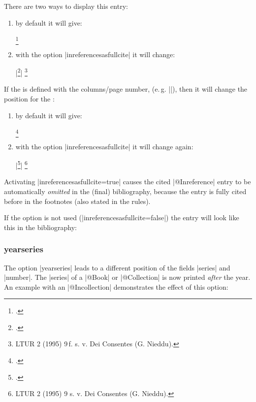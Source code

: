 \documentclass[a4paper,
10pt,
greek,
french,
spanish,
italian,
ngerman,
english,
]{ltxdoc}
\begin{document}
There are two ways to display this entry:
 \begin{enumerate}
 \item by default it will give:  
 \begin{example}
\footnote{\cite{Nieddu1995}.}
 \end{example}
 \item with the option |inreferencesasfullcite| it will change:
 \begin{tcolorbox}[examplebox]
 |\footnote{\cite{Nieddu1995}.}|
 \tcblower
\footnote{LTUR 2 (1995) 9\,f. s. v. Dei Consentes (G. Nieddu).}
 \end{tcolorbox}
  \end{enumerate}

If the  is defined with the columns/page number, (e.\,g. |\cite[9]{Nieddu1995}|), 
then it will change the position for the :
\begin{enumerate} 
 \item by default it will give: 
 \begin{example}
\footnote{\cite[9]{Nieddu1995}.}
 \end{example}
 \item with the option |inreferencesasfullcite| it will change again:
  \begin{tcolorbox}[examplebox]
|\footnote{\cite[9]{Nieddu1995}.}|
 \tcblower
\footnote{LTUR 2 (1995) 9 s. v. Dei Consentes (G. Nieddu).}
 \end{tcolorbox}
  \end{enumerate}



\begin{marker}
    Activating |inreferencesasfullcite=true| causes the cited |@Inreference| entry to be automatically \emph{omitted} in the (final) bibliography,
because the entry is fully cited before in the footnotes (also stated in the \DAI rules).
\end{marker}

If the option is not used (|inreferencesasfullcite=false|) the entry will look like this in the bibliography:


\subsubsection{yearseries}\label{yearseries}
The option |yearseries| leads to a different position of the fields |series| and |number|.
The |series| of a |@Book| or |@Collection| is now printed \emph{after} the year.
An example with an |@Incollection| demonstrates the effect of this option:
 
\end{document}

